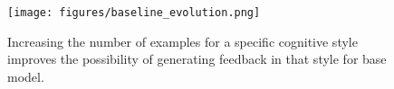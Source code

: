 \begin{figure}[ht]
\centering
  \texttt{[image: figures/baseline\_evolution.png]}
  \caption{ Increasing the number of examples for a specific cognitive style improves the possibility of generating feedback in that style for base model.  }
  \label{fig:baselineincrement}
\end{figure}





\begin{comment}
    

\subsection{Residual Layer}

\label{subsec:qvsresid}
We evaluated the effectiveness of training SAE on residual layer's activation for our task but found no meaningful patterns. Figure \ref{fig:resvq} presents a quantitative comparison using ROUGE-L scores. Table \ref{tab::matching-analysis_appendox4} shows the classification accuracy.

\begin{figure}[t]
  \texttt{[image: figures/resvsq.png]}
  \caption{Quantitative comparison using ROUGE score}
  \label{fig:resvq}
\end{figure}
    

\begin{table}[htbp]
\begin{minipage}{\columnwidth}
    \centering
    \caption{Analysis of Multi-class Classification with SAE trained on residual layer with fixed $L_{1}$=0.003 and Layer 25}
    \label{tab:matching-analysis_appendox4}
    \setlength{\tabcolsep}{4.1pt}
    \scriptsize
    \begin{tabular}{@{}l@{\,}c@{\,}|@{\,}c@{\,}c@{\,}c@{\,}c@{\,}c@{\,}c@{\,}c@{}}
        \toprule
        L & N & rem & und & app & ana & eva & cre & avg \\
        \midrule
         25 & 30  & \calcpercent{390}{960} & \calcpercent{40}{960} & \calcpercent{52}{960} & \calcpercent{114}{960} & \calcpercent{19}{960} & \calcpercent{573}{960} & 
 20.6\% \\
        
         25 & 300  & \calcpercent{478}{960} & \calcpercent{304}{960} & \calcpercent{405}{960} & \calcpercent{232}{960} & \calcpercent{501}{960}  & \calcpercent{548}{960} &  42.8\% \\
        \bottomrule
    \end{tabular}
    \\ \vspace{1mm}
    \footnotesize{Note: L=layer; N=sample size; rem=remember; und=understand;\\
    app=apply; ana=analyze; eva=evaluate; cre=create; avg=average}
    \end{minipage}
\end{table}



\end{comment}
